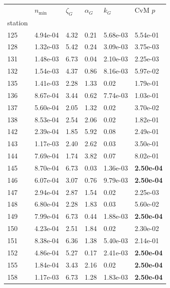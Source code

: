 \begin{figure}[htbp!]
{\begin{minipage}[t]{0.48\linewidth}
        \centering
        \begin{tabular}{llllll}
        \toprule
         & $n_{\min}$ & $\zeta_G$ & $\alpha_G$ & $k_G$ & CvM $p$ \\
        station &  &  &  &  &  \\
        \midrule
                    125 & 4.94e-04 & 4.32 & 0.21 & 5.68e-03 & 5.54e-01\\
                    128 & 1.32e-03 & 5.42 & 0.24 & 3.09e-03 & 3.75e-03\\
                    131 & 1.48e-03 & 6.73 & 0.04 & 2.10e-03 & 2.25e-03\\
                    132 & 1.54e-03 & 4.37 & 0.86 & 8.16e-03 & 5.97e-02\\
                    135 & 1.41e-03 & 2.28 & 1.33 & 0.02 & 1.79e-01\\
                    136 & 8.67e-04 & 3.44 & 0.62 & 7.74e-03 & 1.03e-01\\
                    137 & 5.60e-04 & 2.05 & 1.32 & 0.02 & 3.70e-02\\
                    138 & 8.53e-04 & 2.54 & 2.06 & 0.02 & 1.82e-01\\
                    142 & 2.39e-04 & 1.85 & 5.92 & 0.08 & 2.49e-01\\
                    143 & 1.17e-03 & 2.40 & 2.62 & 0.03 & 3.50e-01\\
                    144 & 7.69e-04 & 1.74 & 3.82 & 0.07 & 8.02e-01\\
                    145 & 8.70e-04 & 6.73 & 0.03 & 1.36e-03 & \textbf{2.50e-04}\\
                    146 & 6.07e-04 & 3.07 & 0.76 & 9.79e-03 & \textbf{2.50e-04}\\
                    147 & 2.94e-04 & 2.87 & 1.54 & 0.02 & 2.25e-03\\
                    148 & 6.80e-04 & 2.28 & 1.83 & 0.03 & 5.60e-02\\
                    149 & 7.99e-04 & 6.73 & 0.44 & 1.88e-03 & \textbf{2.50e-04}\\
                    150 & 4.23e-04 & 2.51 & 1.84 & 0.02 & 2.30e-02\\
                    151 & 8.38e-04 & 6.36 & 1.38 & 5.40e-03 & 2.14e-01\\
                    152 & 4.86e-04 & 5.27 & 0.17 & 2.41e-03 & \textbf{2.50e-04}\\
                    155 & 1.84e-04 & 3.43 & 2.16 & 0.02 & \textbf{2.50e-04}\\
                    158 & 1.17e-03 & 6.73 & 1.28 & 1.83e-03 & \textbf{2.50e-04}\\

\end{tabular}
\end{minipage}}
\end{figure}
